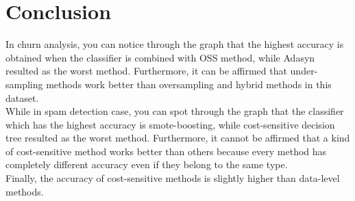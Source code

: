 \chapter{Conclusion}

In churn analysis, you can notice through the graph that the highest accuracy is obtained when the classifier is combined with OSS method, while Adasyn resulted as the worst method. Furthermore, it can be affirmed that  under-sampling methods work better than oversampling and hybrid methods in this dataset.\\
While in spam detection case, you can spot through the graph that the classifier which has the highest accuracy is smote-boosting, while cost-sensitive decision tree resulted as the worst method. Furthermore, it cannot be affirmed that a kind of cost-sensitive method works better than others because every method has completely different accuracy even if they belong to the same type.\\
Finally, the accuracy of cost-sensitive methods is slightly higher than data-level methods. 
